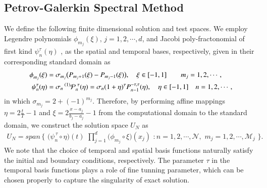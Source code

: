 \subsection{Petrov-Galerkin Spectral Method}
\label{Sec: Implementation}
%
%
We define the following finite dimensional solution and test spaces. We employ Legendre polynomials $\phi_{m_j}(\xi), \, j=1,2,\cdots,d$, and Jacobi poly-fractonomial of first kind $\psi^{\tau}_n(\eta)$ \cite{zayernouri2015tempered,Zayernouri2013}, as the spatial and temporal bases, respectively, given in their corresponding standard domain as
%
\begin{align}
\label{Eq: Spatial Basis}
%
\phi^{}_{m_j} ( \xi )  & =  \sigma_{m_j} \big{(} P_{m_j+1} (\xi) - P_{m_j-1} (\xi)\big{)},  \quad  \xi \in [-1,1]  \qquad m_j=1,2,\cdots ,
%
\\
\label{Eq: Temporal Basis}
\psi^{\tau}_n(\eta) & = {\sigma}_{n} \prescript{(1)}{}{ \mathcal{P}}_{n}^{\,\,\tau}(\eta) = {\sigma}_{n} (1+\eta)^{\tau} P_{n-1}^{-\tau, \tau} (\eta), \quad \eta\in [-1,1]  \quad n=1,2,\cdots ,
%
\end{align}
%
in which $\sigma_{m_j} = 2 + (-1)^{m_j}$. Therefore, by performing affine mappings $\eta = 2\frac{t}{T}-1$ and $\xi = 2\frac{x-a_j}{b_j-a_j} -1$ from the computational domain to the standard domain, we construct the solution space $U_N$ as
%
\begin{align}
\label{Eq: Solution Space :PG}
U_N = 
span \, \Big\{ \,\,   
\Big( \psi^{\,\tau}_n \circ \eta \Big) ( t ) \,\,
\prod_{j=1}^{d} \Big( \phi^{}_{m_j} \circ \xi \Big)  (x_j) \,\,
: n = 1,2, \cdots, \mathcal{N}, \,\, m_j= 1,2, \cdots, \mathcal{M}_j
\,\, \Big\}.
%
\end{align}
%
We note that the choice of temporal and spatial basis functions naturally satisfy the initial and boundary conditions, respectively. The parameter $\tau$ in the temporal basis functions plays a role of fine tunning parameter, which can be chosen properly to capture the singularity of exact solution. 


